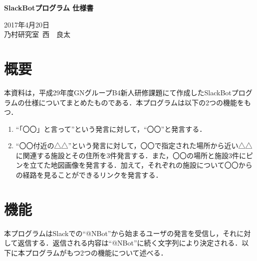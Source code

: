 \documentclass[fleqn, 14pt]{extarticlej}
\begin{document}
\begin{center}
{\Large {\bf SlackBotプログラム 仕様書}}

\end{center}

\begin{flushright}
  2017年4月20日\\
  
  乃村研究室\ 西　良太
\end{flushright}

\section{概要}
本資料は，平成29年度GNグループB4新人研修課題にて作成したSlackBotプログラムの仕様についてまとめたものである．本プログラムは以下の2つの機能をもつ．

\begin{enumerate}
\item ``「〇〇」と言って''という発言に対して，``〇〇''と発言する．
\item ``〇〇付近の△△''という発言に対して，〇〇で指定された場所から近い△△に関連する施設とその住所を3件発言する．また，〇〇の場所と施設3件にピンを立てた地図画像を発言する．加えて，それぞれの施設について〇〇からの経路を見ることができるリンクを発言する．
\end{enumerate}

\section{機能}
本プログラムはSlackでの``@NBot''から始まるユーザの発言を受信し，それに対して返信する．返信される内容は``@NBot''に続く文字列により決定される．以下に本プログラムがもつ2つの機能について述べる．
\end{document}

